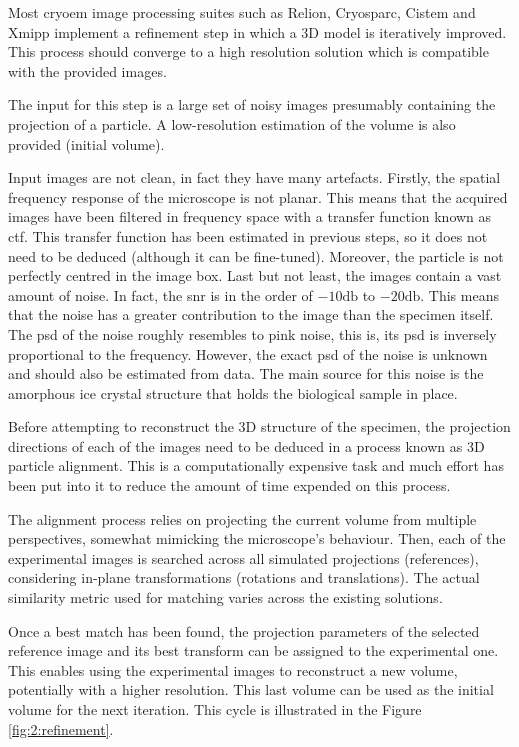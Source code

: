 \documentclass[../main.tex]{subfiles}
\begin{document}
Most \gls{cryoem} image processing suites such as Relion\cite{scheres2021}, Cryosparc\cite{cryosparc}, Cistem\cite{grigorieff2018} and Xmipp\cite{sorzano2021} implement a refinement step in which a 3D model is iteratively improved. This process should converge to a high resolution solution which is compatible with the provided images. 

The input for this step is a large set of noisy images presumably containing the projection of a particle. A low-resolution estimation of the volume is also provided (initial volume)\cite{sorzano2017b}.

Input images are not clean, in fact they have many artefacts. Firstly, the spatial frequency response of the microscope is not planar. This means that the acquired images have been filtered in frequency space with a transfer function known as \gls{ctf}. This transfer function has been estimated in previous steps, so it does not need to be deduced (although it can be fine-tuned). Moreover, the particle is not perfectly centred in the image box. Last but not least, the images contain a vast amount of noise. In fact, the \gls{snr} is in the order of $-10 \si{\decibel}$ to $-20 \si{\decibel}$\cite{sorzano2022}. This means that the noise has a greater contribution to the image than the specimen itself. The \gls{psd} of the noise roughly resembles to pink noise, this is, its \gls{psd} is inversely proportional to the frequency. However, the exact \gls{psd} of the noise is unknown and should also be estimated from data\cite{unser2005}. The main source for this noise is the amorphous ice crystal structure that holds the biological sample in place.

Before attempting to reconstruct the 3D structure of the specimen, the projection directions of each of the images need to be deduced in a process known as 3D particle alignment\cite{sorzano2017b}. This is a computationally expensive task and much effort has been put into it to reduce the amount of time expended on this process. 

The alignment process relies on projecting the current volume from multiple perspectives, somewhat mimicking the microscope's behaviour. Then, each of the experimental images is searched across all simulated projections (references), considering in-plane transformations (rotations and translations). The actual similarity metric used for matching varies across the existing solutions\cite{sorzano2017b}. 

Once a best match has been found, the projection parameters of the selected reference image and its best transform can be assigned to the experimental one. This enables using the experimental images to reconstruct a new volume, potentially with a higher resolution. This last volume can be used as the initial volume for the next iteration. This cycle is illustrated in the Figure \ref{fig:2:refinement}. 
\end{document}
